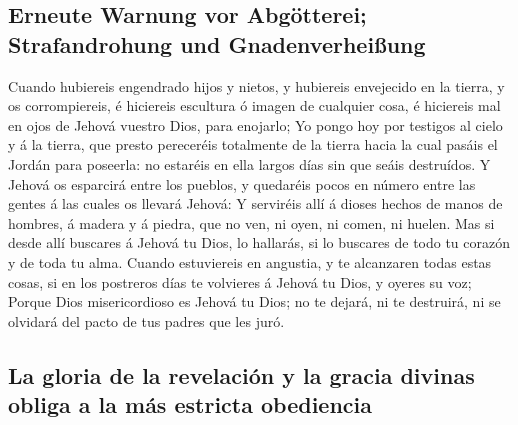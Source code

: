 \hypertarget{erneute-warnung-vor-abguxf6tterei-strafandrohung-und-gnadenverheiuxdfung}{%
\subsection{Erneute Warnung vor Abgötterei; Strafandrohung und
Gnadenverheißung}\label{erneute-warnung-vor-abguxf6tterei-strafandrohung-und-gnadenverheiuxdfung}}

 Cuando hubiereis engendrado hijos y nietos, y hubiereis
envejecido en la tierra, y os corrompiereis, é hiciereis escultura ó
imagen de cualquier cosa, é hiciereis mal en ojos de Jehová vuestro
Dios, para enojarlo;  Yo pongo hoy por testigos al cielo
y á la tierra, que presto pereceréis totalmente de la tierra hacia la
cual pasáis el Jordán para poseerla: no estaréis en ella largos días sin
que seáis destruídos.  Y Jehová os esparcirá entre los
pueblos, y quedaréis pocos en número entre las gentes á las cuales os
llevará Jehová:  Y serviréis allí á dioses hechos de
manos de hombres, á madera y á piedra, que no ven, ni oyen, ni comen, ni
huelen.  Mas si desde allí buscares á Jehová tu Dios, lo
hallarás, si lo buscares de todo tu corazón y de toda tu alma.
 Cuando estuviereis en angustia, y te alcanzaren todas
estas cosas, si en los postreros días te volvieres á Jehová tu Dios, y
oyeres su voz;  Porque Dios misericordioso es Jehová tu
Dios; no te dejará, ni te destruirá, ni se olvidará del pacto de tus
padres que les juró.

\hypertarget{la-gloria-de-la-revelaciuxf3n-y-la-gracia-divinas-obliga-a-la-muxe1s-estricta-obediencia}{%
\subsection{La gloria de la revelación y la gracia divinas obliga a la
más estricta
obediencia}\label{la-gloria-de-la-revelaciuxf3n-y-la-gracia-divinas-obliga-a-la-muxe1s-estricta-obediencia}}


